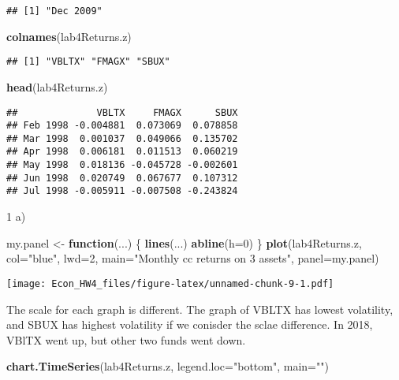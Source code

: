\documentclass[]{article}
\newenvironment{Shaded}{\begin{snugshade}}{\end{snugshade}}
\newcommand{\KeywordTok}[1]{\textcolor[rgb]{0.13,0.29,0.53}{\textbf{#1}}}
\newcommand{\DataTypeTok}[1]{\textcolor[rgb]{0.13,0.29,0.53}{#1}}
\newcommand{\DecValTok}[1]{\textcolor[rgb]{0.00,0.00,0.81}{#1}}
\newcommand{\StringTok}[1]{\textcolor[rgb]{0.31,0.60,0.02}{#1}}
\newcommand{\ControlFlowTok}[1]{\textcolor[rgb]{0.13,0.29,0.53}{\textbf{#1}}}
\newcommand{\NormalTok}[1]{#1}
\begin{document}
\begin{verbatim}
## [1] "Dec 2009"
\end{verbatim}

\begin{Shaded}
\begin{Highlighting}[]
\KeywordTok{colnames}\NormalTok{(lab4Returns.z) }
\end{Highlighting}
\end{Shaded}

\begin{verbatim}
## [1] "VBLTX" "FMAGX" "SBUX"
\end{verbatim}

\begin{Shaded}
\begin{Highlighting}[]
\KeywordTok{head}\NormalTok{(lab4Returns.z)}
\end{Highlighting}
\end{Shaded}

\begin{verbatim}
##              VBLTX     FMAGX      SBUX
## Feb 1998 -0.004881  0.073069  0.078858
## Mar 1998  0.001037  0.049066  0.135702
## Apr 1998  0.006181  0.011513  0.060219
## May 1998  0.018136 -0.045728 -0.002601
## Jun 1998  0.020749  0.067677  0.107312
## Jul 1998 -0.005911 -0.007508 -0.243824
\end{verbatim}

1 a)

\begin{Shaded}
\begin{Highlighting}[]
\NormalTok{my.panel <-}\StringTok{ }\ControlFlowTok{function}\NormalTok{(...) \{}
  \KeywordTok{lines}\NormalTok{(...)}
  \KeywordTok{abline}\NormalTok{(}\DataTypeTok{h=}\DecValTok{0}\NormalTok{)}
\NormalTok{\}}
\KeywordTok{plot}\NormalTok{(lab4Returns.z, }\DataTypeTok{col=}\StringTok{"blue"}\NormalTok{, }\DataTypeTok{lwd=}\DecValTok{2}\NormalTok{, }\DataTypeTok{main=}\StringTok{"Monthly cc returns on 3 assets"}\NormalTok{,}
     \DataTypeTok{panel=}\NormalTok{my.panel)}
\end{Highlighting}
\end{Shaded}

\texttt{[image: Econ\_HW4\_files/figure-latex/unnamed-chunk-9-1.pdf]}

The scale for each graph is different. The graph of VBLTX has lowest
volatility, and SBUX has highest volatility if we conisder the sclae
difference. In 2018, VBlTX went up, but other two funds went down.

\begin{Shaded}
\begin{Highlighting}[]
\KeywordTok{chart.TimeSeries}\NormalTok{(lab4Returns.z, }\DataTypeTok{legend.loc=}\StringTok{"bottom"}\NormalTok{, }\DataTypeTok{main=}\StringTok{""}\NormalTok{) }
\end{Highlighting}
\end{Shaded}
\end{document}
